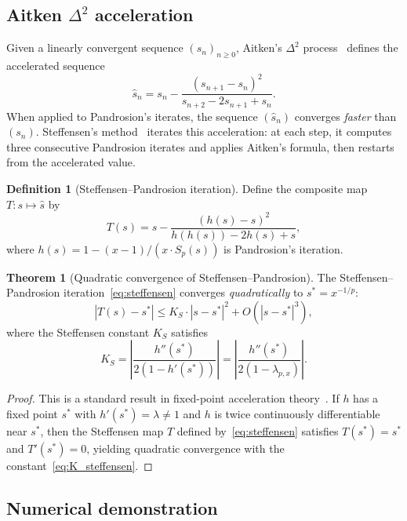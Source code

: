 \documentclass[11pt,a4paper]{article}
\theoremstyle{definition}
\newtheorem{definition}{Definition}[section]
\newtheorem{theorem}{Theorem}[section]
\begin{document}
\subsection{Aitken \texorpdfstring{$\Delta^2$}{Delta-squared} acceleration}

Given a linearly convergent sequence $(s_n)_{n \geq 0}$, Aitken's $\Delta^2$ process~\cite{stoer} defines the accelerated sequence
\[
  \hat{s}_n = s_n - \frac{(s_{n+1} - s_n)^2}{s_{n+2} - 2s_{n+1} + s_n}.
\]
When applied to Pandrosion's iterates, the sequence $(\hat{s}_n)$ converges \emph{faster} than $(s_n)$. Steffensen's method~\cite{steffensen} iterates this acceleration: at each step, it computes three consecutive Pandrosion iterates and applies Aitken's formula, then restarts from the accelerated value.

\begin{definition}[Steffensen--Pandrosion iteration]
\label{def:steffensen}
Define the composite map $T : s \mapsto \hat{s}$ by
\begin{equation}
  \label{eq:steffensen}
  T(s) = s - \frac{(h(s) - s)^2}{h(h(s)) - 2h(s) + s},
\end{equation}
where $h(s) = 1 - (x-1)/(x \cdot S_p(s))$ is Pandrosion's iteration.
\end{definition}

\begin{theorem}[Quadratic convergence of Steffensen--Pandrosion]
\label{thm:steffensen}
The Steffensen--Pandrosion iteration~\eqref{eq:steffensen} converges \emph{quadratically} to $s^* = x^{-1/p}$:
\[
  |T(s) - s^*| \leq K_S \cdot |s - s^*|^2 + O(|s - s^*|^3),
\]
where the Steffensen constant $K_S$ satisfies
\begin{equation}
  \label{eq:K_steffensen}
  K_S = \left|\frac{h''(s^*)}{2(1 - h'(s^*))}\right| = \left|\frac{h''(s^*)}{2(1 - \lambda_{p,x})}\right|.
\end{equation}
\end{theorem}

\begin{proof}
This is a standard result in fixed-point acceleration theory~\cite{stoer}. If $h$ has a fixed point $s^*$ with $h'(s^*) = \lambda \neq 1$ and $h$ is twice continuously differentiable near $s^*$, then the Steffensen map $T$ defined by~\eqref{eq:steffensen} satisfies $T(s^*) = s^*$ and $T'(s^*) = 0$, yielding quadratic convergence with the constant~\eqref{eq:K_steffensen}.
\end{proof}

\subsection{Numerical demonstration}
\end{document}
